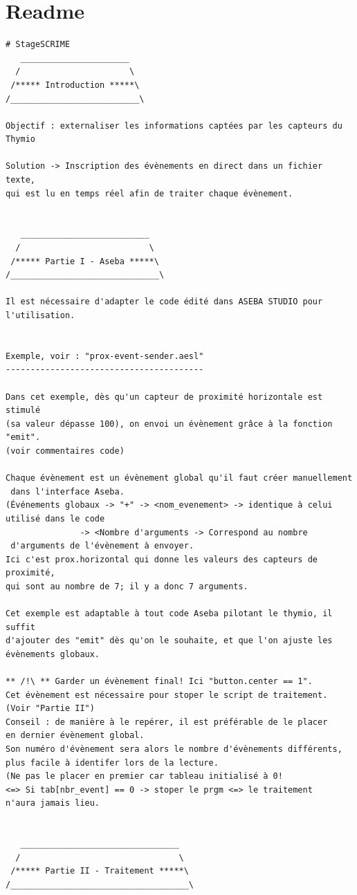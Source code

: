 \documentclass[a4paper, 12pt]{report}
\begin{document}
\section*{Readme}
\begin{verbatim}
# StageSCRIME
   ______________________
  /                      \
 /***** Introduction *****\
/__________________________\

Objectif : externaliser les informations captées par les capteurs du Thymio

Solution -> Inscription des évènements en direct dans un fichier texte,
qui est lu en temps réel afin de traiter chaque évènement.


   __________________________
  /                          \
 /***** Partie I - Aseba *****\
/______________________________\

Il est nécessaire d'adapter le code édité dans ASEBA STUDIO pour l'utilisation.


Exemple, voir : "prox-event-sender.aesl"
----------------------------------------

Dans cet exemple, dès qu'un capteur de proximité horizontale est stimulé
(sa valeur dépasse 100), on envoi un évènement grâce à la fonction "emit".
(voir commentaires code)

Chaque évènement est un évènement global qu'il faut créer manuellement
 dans l'interface Aseba.
(Événements globaux -> "+" -> <nom_evenement> -> identique à celui
utilisé dans le code
			   -> <Nombre d'arguments -> Correspond au nombre
 d'arguments de l'évènement à envoyer. 
Ici c'est prox.horizontal qui donne les valeurs des capteurs de proximité,
qui sont au nombre de 7; il y a donc 7 arguments.

Cet exemple est adaptable à tout code Aseba pilotant le thymio, il suffit 
d'ajouter des "emit" dès qu'on le souhaite, et que l'on ajuste les 
évènements globaux.

** /!\ ** Garder un évènement final! Ici "button.center == 1". 
Cet évènement est nécessaire pour stoper le script de traitement. 
(Voir "Partie II")
Conseil : de manière à le repérer, il est préférable de le placer
en dernier évènement global. 
Son numéro d'évènement sera alors le nombre d'évènements différents, 
plus facile à identifer lors de la lecture.
(Ne pas le placer en premier car tableau initialisé à 0! 
<=> Si tab[nbr_event] == 0 -> stoper le prgm <=> le traitement 
n'aura jamais lieu.


   ________________________________
  /                                \
 /***** Partie II - Traitement *****\
/____________________________________\


\end{verbatim}
\end{document}
